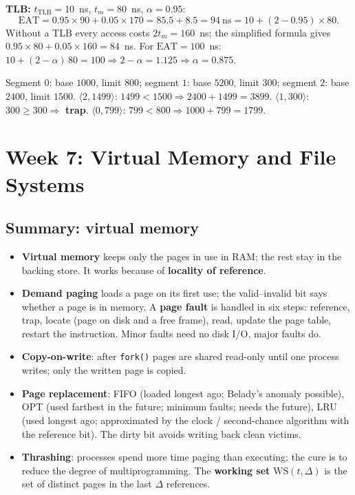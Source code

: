 \documentclass[11pt,a4paper]{article}
\newcommand{\term}[1]{\textbf{\color{mintdeep}#1}}
\newcommand{\cmd}[1]{\texttt{#1}}
\begin{document}
\textbf{TLB:} $t_{\text{TLB}} = 10$~ns, $t_m = 80$~ns, $\alpha = 0.95$:
\[
\text{EAT} = 0.95 \times 90 + 0.05 \times 170 = 85.5 + 8.5 = 94\ \text{ns} = 10 + (2 - 0.95)\times 80 .
\]
Without a TLB every access costs $2t_m = 160$~ns; the simplified formula gives $0.95\times80 + 0.05\times160 = 84$~ns. For $\text{EAT} = 100$~ns: $10 + (2-\alpha)\,80 = 100 \Rightarrow 2 - \alpha = 1.125 \Rightarrow \alpha = 0.875$.

\begin{example}
Segment $0$: base $1000$, limit $800$; segment $1$: base $5200$, limit $300$; segment $2$: base $2400$, limit $1500$.
$\langle 2, 1499\rangle$: $1499 < 1500 \Rightarrow 2400 + 1499 = 3899$.
$\langle 1, 300\rangle$: $300 \ge 300 \Rightarrow$ \textbf{trap}.
$\langle 0, 799\rangle$: $799 < 800 \Rightarrow 1000 + 799 = 1799$.
\end{example}

\section{Week 7: Virtual Memory and File Systems}
\label{sec:w7}
\subsection*{Summary: virtual memory}
\begin{itemize}
  \item \term{Virtual memory} keeps only the pages in use in RAM; the rest stay in the backing store. It works because of \term{locality of reference}.
  \item \term{Demand paging} loads a page on its first use; the valid--invalid bit says whether a page is in memory. A \term{page fault} is handled in six steps: reference, trap, locate (page on disk and a free frame), read, update the page table, restart the instruction. Minor faults need no disk I/O, major faults do.
  \item \term{Copy-on-write}: after \cmd{fork()} pages are shared read-only until one process writes; only the written page is copied.
  \item \textbf{Page replacement}: FIFO (loaded longest ago; Belady's anomaly possible), OPT (used farthest in the future; minimum faults; needs the future), LRU (used longest ago; approximated by the clock / second-chance algorithm with the reference bit). The dirty bit avoids writing back clean victims.
  \item \term{Thrashing}: processes spend more time paging than executing; the cure is to reduce the degree of multiprogramming. The \term{working set} $\text{WS}(t,\Delta)$ is the set of distinct pages in the last $\Delta$ references.
\end{itemize}
\end{document}
